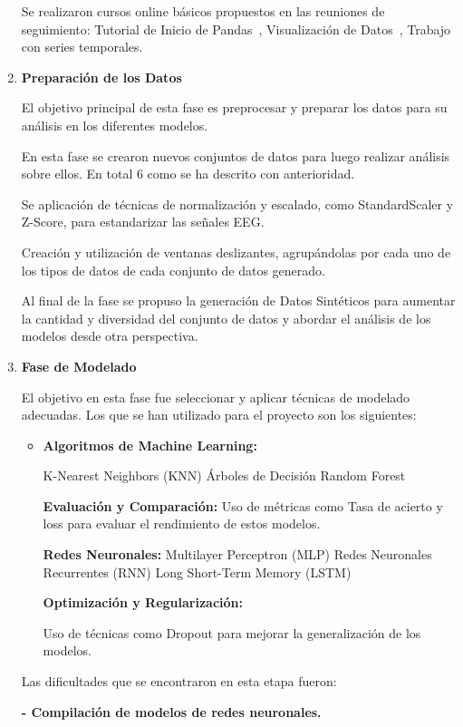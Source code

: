 \begin{enumerate}
Se realizaron cursos online básicos propuestos en las reuniones de seguimiento:
Tutorial de Inicio de Pandas~\cite{curso:a}, Visualización de Datos~\cite{curso:b}, Trabajo con series temporales.~\cite{curso:c}

\item
\textbf{Preparación de los Datos}

El objetivo principal de esta fase es preprocesar y preparar los datos para su análisis en los diferentes modelos.

En esta fase se crearon nuevos conjuntos de datos para luego realizar análisis sobre ellos. En total 6 como se ha descrito con anterioridad.

Se aplicación de técnicas de normalización y escalado, como StandardScaler y Z-Score, para estandarizar las señales EEG.

Creación y utilización de ventanas deslizantes, agrupándolas por cada uno de los tipos de datos de cada conjunto de datos generado.

Al final de la fase se propuso la generación de Datos Sintéticos para aumentar la cantidad y diversidad del conjunto de datos y abordar el análisis de los modelos desde otra perspectiva.

\item
\textbf{Fase de Modelado}

El objetivo en esta fase fue seleccionar y aplicar técnicas de modelado adecuadas. Los que se han utilizado para el proyecto son los siguientes:

	\begin{itemize}
	
	\item
	\textbf{Algoritmos de Machine Learning:}

	K-Nearest Neighbors (KNN)
	Árboles de Decisión
	Random Forest

	\textbf{Evaluación y Comparación:}
	Uso de métricas como Tasa de acierto y loss para evaluar el rendimiento de estos modelos.

	\textbf{Redes Neuronales:}
	Multilayer Perceptron (MLP)
	Redes Neuronales Recurrentes (RNN)
	Long Short-Term Memory (LSTM)

	\textbf{Optimización y Regularización:} 

	Uso de técnicas como Dropout para mejorar la generalización de los modelos.
	\end{itemize}


Las dificultades que se encontraron en esta etapa fueron:

\textbf{- Compilación de modelos de redes neuronales. }


\end{enumerate}
